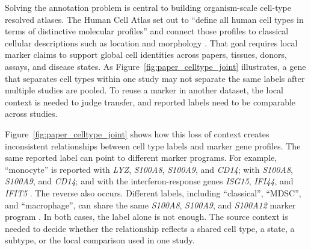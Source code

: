 \documentclass[10pt,twocolumn]{article}
\theoremstyle{plain}
\theoremstyle{definition}
\theoremstyle{remark}
\begin{document}


Solving the annotation problem is central to building organism-scale cell-type resolved atlases. The Human Cell Atlas set out to ``define all human cell types in terms of distinctive molecular profiles'' and connect those profiles to classical cellular descriptions such as location and morphology \citep{Regev2017HumanCellAtlas}. That goal requires local marker claims to support global cell identities across papers, tissues, donors, assays, and disease states. As Figure~\ref{fig:paper_celltype_joint} illustrates, a gene that separates cell types within one study may not separate the same labels after multiple studies are pooled. To reuse a marker in another dataset, the local context is needed to judge transfer, and reported labels need to be comparable across studies.

Figure~\ref{fig:paper_celltype_joint} shows how this loss of context creates inconsistent relationships between cell type labels and marker gene profiles. The same reported label can point to different marker programs. For example, ``monocyte'' is reported with \textit{LYZ}, \textit{S100A8}, \textit{S100A9}, and \textit{CD14}; with \textit{S100A8}, \textit{S100A9}, and \textit{CD14}; and with the interferon-response genes \textit{ISG15}, \textit{IFI44}, and \textit{IFIT5} \citep{Yang2019decontx,Yu2024hcnetlas,Rigby2023}. The reverse also occurs. Different labels, including ``classical'', ``MDSC'', and ``macrophage'', can share the same \textit{S100A8}, \textit{S100A9}, and \textit{S100A12} marker program \citep{Dominguez2022celltypist,Werba2023pdac,Pelka2021crc}. In both cases, the label alone is not enough. The source context is needed to decide whether the relationship reflects a shared cell type, a state, a subtype, or the local comparison used in one study.
\end{document}
